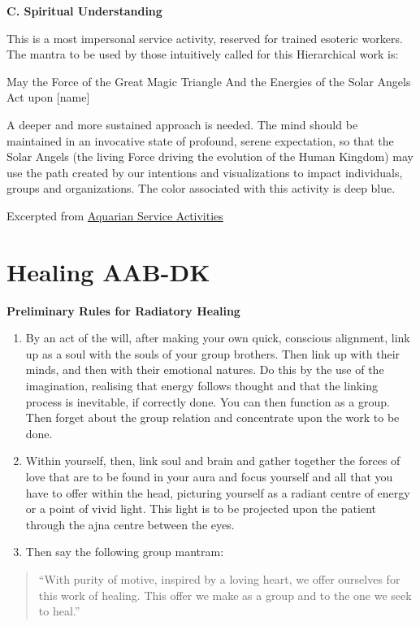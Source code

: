 \documentclass[
]{book}
\begin{document}
\textbf{C. Spiritual Understanding}

This is a most impersonal service activity, reserved for trained esoteric workers. The mantra to be used by those intuitively called for this Hierarchical work is:

May the Force of the Great Magic Triangle
And the Energies of the Solar Angels
Act upon {[}name{]}

A deeper and more sustained approach is needed. The mind should be maintained in an invocative state of profound, serene expectation, so that the Solar Angels (the living Force driving the evolution of the Human Kingdom) may use the path created by our intentions and visualizations to impact individuals, groups and organizations. The color associated with this activity is deep blue.

Excerpted from \href{https://www.agni-yoga.org/AMS-SA.htm}{Aquarian Service Activities}

\hypertarget{healing-aab-dk}{%
\section{Healing AAB-DK}\label{healing-aab-dk}}

\textbf{Preliminary Rules for Radiatory Healing}

\begin{enumerate}
\def\labelenumi{\arabic{enumi}.}
\item
  By an act of the will, after making your own quick, conscious alignment, link up as a soul with the souls of your group brothers. Then link up with their minds, and then with their emotional natures. Do this by the use of the imagination, realising that energy follows thought and that the linking process is inevitable, if correctly done. You can then function as a group. Then forget about the group relation and concentrate upon the work to be done.
\item
  Within yourself, then, link soul and brain and gather together the forces of love that are to be found in your aura and focus yourself and all that you have to offer within the head, picturing yourself as a radiant centre of energy or a point of vivid light. This light is to be projected upon the patient through the ajna centre between the eyes.
\item
  Then say the following group mantram:
\end{enumerate}

\begin{quote}
``With purity of motive, inspired by a loving heart, we offer ourselves for this work of healing. This offer we make as a group and to the one we seek to heal.''
\end{quote}
\end{document}

